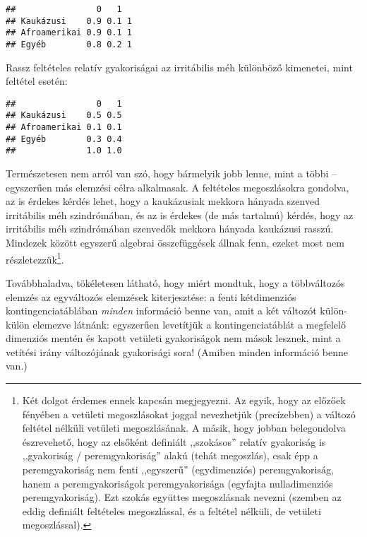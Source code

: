 \documentclass[
]{book}
\newenvironment{Shaded}{\begin{snugshade}}{\end{snugshade}}
\newcommand{\DecValTok}[1]{\textcolor[rgb]{0.00,0.00,0.81}{#1}}
\newcommand{\KeywordTok}[1]{\textcolor[rgb]{0.13,0.29,0.53}{\textbf{#1}}}
\newcommand{\NormalTok}[1]{#1}
\newcommand{\OperatorTok}[1]{\textcolor[rgb]{0.81,0.36,0.00}{\textbf{#1}}}
\newcommand{\StringTok}[1]{\textcolor[rgb]{0.31,0.60,0.02}{#1}}
\let\rmarkdownfootnote\footnote%
\def\footnote{\protect\rmarkdownfootnote}
\begin{document}
\begin{verbatim}
##                0   1  
## Kaukázusi    0.9 0.1 1
## Afroamerikai 0.9 0.1 1
## Egyéb        0.8 0.2 1
\end{verbatim}

Rassz feltételes relatív gyakoriságai az irritábilis méh különböző kimenetei, mint feltétel esetén:

\begin{Shaded}
\end{Shaded}

\begin{verbatim}
##                0   1
## Kaukázusi    0.5 0.5
## Afroamerikai 0.1 0.1
## Egyéb        0.3 0.4
##              1.0 1.0
\end{verbatim}

Természetesen nem arról van szó, hogy bármelyik jobb lenne, mint a többi -- egyszerűen más elemzési célra alkalmasak. A feltételes megoszlásokra gondolva, az is érdekes kérdés lehet, hogy a kaukázusiak mekkora hányada szenved irritábilis méh szindrómában, és az is érdekes (de más tartalmú) kérdés, hogy az irritábilis méh szindrómában szenvedők mekkora hányada kaukázusi rasszú. Mindezek között egyszerű algebrai összefüggések állnak fenn, ezeket most nem részletezzük\footnote{Két dolgot érdemes ennek kapcsán megjegyezni. Az egyik, hogy az előzőek fényében a vetületi megoszlásokat joggal nevezhetjük (precízebben) a változó feltétel nélküli vetületi megoszlásának. A másik, hogy jobban belegondolva észrevehető, hogy az elsőként definiált ,,szokásos'' relatív gyakoriság is ,,gyakoriság / peremgyakoriság'' alakú (tehát megoszlás), csak épp a peremgyakoriság nem fenti ,,egyszerű'' (egydimenziós) peremgyakoriság, hanem a peremgyakoriságok peremgyakorisága (egyfajta nulladimenziós peremgyakoriság). Ezt szokás együttes megoszlásnak nevezni (szemben az eddig definiált feltételes megoszlással, és a feltétel nélküli, de vetületi megoszlással).}.

Továbbhaladva, tökéletesen látható, hogy miért mondtuk, hogy a többváltozós elemzés az egyváltozós elemzések kiterjesztése: a fenti kétdimenziós kontingenciatáblában \emph{minden} információ benne van, amit a két változót külön-külön elemezve látnánk: egyszerűen levetítjük a kontingenciatáblát a megfelelő dimenziós mentén és kapott vetületi gyakoriságok nem mások lesznek, mint a vetítési irány változójának gyakorisági sora! (Amiben minden információ benne van.)
\end{document}
